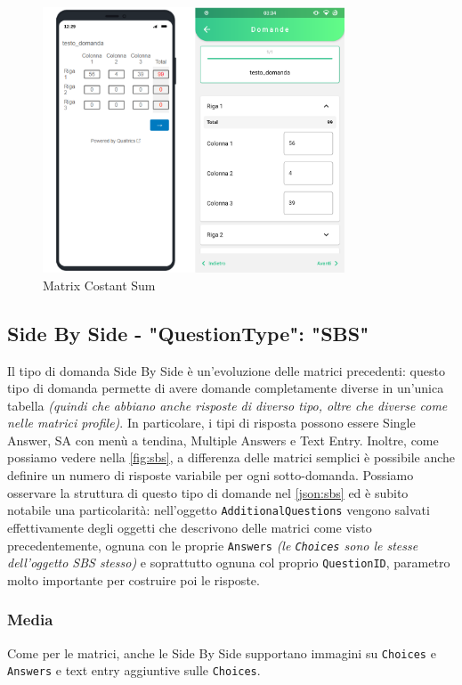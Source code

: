 \begin{figure}[h!]
\centering
\includegraphics[width=0.8\textwidth]{img/matrix_cs}
\caption{Matrix Costant Sum}
\label{fig:matrix_cs}
\end{figure}

\clearpage
\subsection{Side By Side - "QuestionType": "SBS"}
Il tipo di domanda Side By Side è un'evoluzione delle matrici precedenti: questo tipo di domanda permette di avere domande completamente diverse in un'unica tabella \textit{(quindi che abbiano anche risposte di diverso tipo, oltre che diverse come nelle matrici profile)}. In particolare, i tipi di risposta possono essere Single Answer, SA con menù a tendina, Multiple Answers e Text Entry. Inoltre, come possiamo vedere nella \autoref{fig:sbs}, a differenza delle matrici semplici è possibile anche definire un numero di risposte variabile per ogni sotto-domanda. Possiamo osservare la struttura di questo tipo di domande nel \autoref{json:sbs} ed è subito notabile una particolarità: nell'oggetto \texttt{AdditionalQuestions} vengono salvati effettivamente degli oggetti che descrivono delle matrici come visto precedentemente, ognuna con le proprie \texttt{Answers} \textit{(le \texttt{Choices} sono le stesse dell'oggetto SBS stesso)} e soprattutto ognuna col proprio \texttt{QuestionID}, parametro molto importante per costruire poi le risposte.

\subsubsection{Media}
Come per le matrici, anche le Side By Side supportano immagini su \texttt{Choices} e \texttt{Answers} e text entry aggiuntive sulle \texttt{Choices}.

